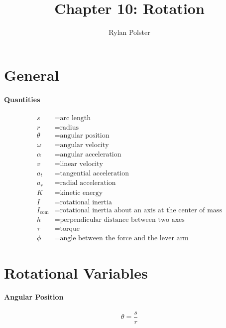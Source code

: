 \documentclass{article}
\title{Chapter 10: Rotation}
\author{Rylan Polster}
\begin{document}
    \maketitle

    \section*{General}

        \paragraph{Quantities}
        \begin{align}
            s &= \text{arc length} \nonumber\\
            r &= \text{radius} \nonumber\\
            \theta &= \text{angular position} \nonumber\\
            \omega &= \text{angular velocity} \nonumber\\
            \alpha &= \text{angular acceleration} \nonumber\\
            v &= \text{linear velocity} \nonumber\\
            a_t &= \text{tangential acceleration} \nonumber\\
            a_r &= \text{radial acceleration} \nonumber\\
            K &= \text{kinetic energy} \nonumber\\
            I &= \text{rotational inertia} \nonumber\\
            I_\text{com} &= \text{rotational inertia about an axis at the center of mass} \nonumber\\
            h &= \text{perpendicular distance between two axes} \nonumber\\
            \tau &= \text{torque} \nonumber\\
            \phi &= \text{angle between the force and the lever arm} \nonumber
        \end{align}

    \section{Rotational Variables}

        \paragraph{Angular Position}
        \begin{equation}
            \theta = \frac{s}{r}
        \end{equation}
\end{document}
